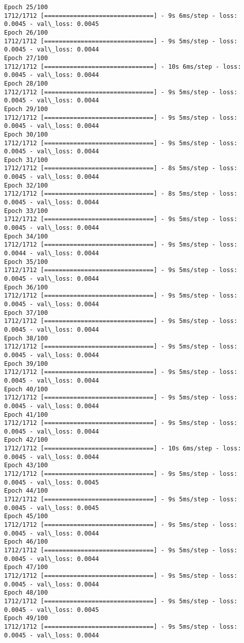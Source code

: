 \documentclass[11pt]{article}
\begin{document}
\begin{Verbatim}[commandchars=\\\{\}]
Epoch 25/100
1712/1712 [==============================] - 9s 6ms/step - loss: 0.0045 - val\_loss: 0.0045
Epoch 26/100
1712/1712 [==============================] - 9s 5ms/step - loss: 0.0045 - val\_loss: 0.0044
Epoch 27/100
1712/1712 [==============================] - 10s 6ms/step - loss: 0.0045 - val\_loss: 0.0044
Epoch 28/100
1712/1712 [==============================] - 9s 5ms/step - loss: 0.0045 - val\_loss: 0.0044
Epoch 29/100
1712/1712 [==============================] - 9s 5ms/step - loss: 0.0045 - val\_loss: 0.0044
Epoch 30/100
1712/1712 [==============================] - 9s 5ms/step - loss: 0.0045 - val\_loss: 0.0044
Epoch 31/100
1712/1712 [==============================] - 8s 5ms/step - loss: 0.0045 - val\_loss: 0.0044
Epoch 32/100
1712/1712 [==============================] - 8s 5ms/step - loss: 0.0045 - val\_loss: 0.0044
Epoch 33/100
1712/1712 [==============================] - 9s 5ms/step - loss: 0.0045 - val\_loss: 0.0044
Epoch 34/100
1712/1712 [==============================] - 9s 5ms/step - loss: 0.0044 - val\_loss: 0.0044
Epoch 35/100
1712/1712 [==============================] - 9s 5ms/step - loss: 0.0045 - val\_loss: 0.0044
Epoch 36/100
1712/1712 [==============================] - 9s 5ms/step - loss: 0.0045 - val\_loss: 0.0044
Epoch 37/100
1712/1712 [==============================] - 9s 5ms/step - loss: 0.0045 - val\_loss: 0.0044
Epoch 38/100
1712/1712 [==============================] - 9s 5ms/step - loss: 0.0045 - val\_loss: 0.0044
Epoch 39/100
1712/1712 [==============================] - 9s 5ms/step - loss: 0.0045 - val\_loss: 0.0044
Epoch 40/100
1712/1712 [==============================] - 9s 5ms/step - loss: 0.0045 - val\_loss: 0.0044
Epoch 41/100
1712/1712 [==============================] - 9s 5ms/step - loss: 0.0045 - val\_loss: 0.0044
Epoch 42/100
1712/1712 [==============================] - 10s 6ms/step - loss: 0.0045 - val\_loss: 0.0044
Epoch 43/100
1712/1712 [==============================] - 9s 5ms/step - loss: 0.0045 - val\_loss: 0.0045
Epoch 44/100
1712/1712 [==============================] - 9s 5ms/step - loss: 0.0045 - val\_loss: 0.0045
Epoch 45/100
1712/1712 [==============================] - 9s 5ms/step - loss: 0.0045 - val\_loss: 0.0044
Epoch 46/100
1712/1712 [==============================] - 9s 5ms/step - loss: 0.0045 - val\_loss: 0.0044
Epoch 47/100
1712/1712 [==============================] - 9s 5ms/step - loss: 0.0045 - val\_loss: 0.0044
Epoch 48/100
1712/1712 [==============================] - 9s 5ms/step - loss: 0.0045 - val\_loss: 0.0045
Epoch 49/100
1712/1712 [==============================] - 9s 5ms/step - loss: 0.0045 - val\_loss: 0.0044

\end{Verbatim}
\end{document}
